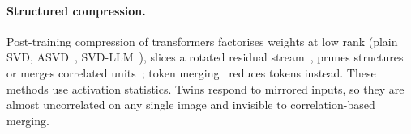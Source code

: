 \paragraph{Structured compression.}
Post-training compression of transformers factorises weights at low rank (plain SVD, ASVD~\citep{yuan2023asvd},
SVD-LLM~\citep{wang2025svdllm}), slices a rotated residual stream~\citep{ashkboos2024slicegpt}, prunes
structures~\citep{an2024flap} or merges correlated units~\citep{stoica2024zipit}; token merging~\citep{bolya2023tome}
reduces tokens instead. These methods use activation statistics. Twins respond to mirrored inputs, so they are almost
uncorrelated on any single image and invisible to correlation-based merging.
